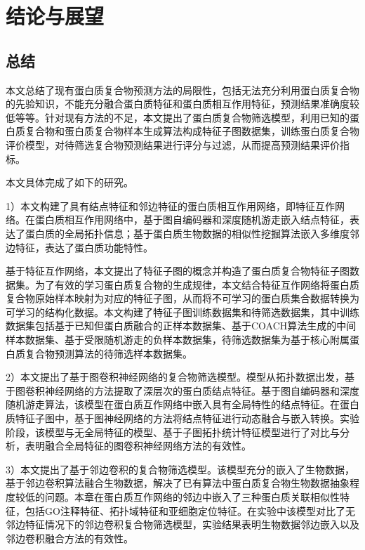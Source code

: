 \chapter{结论与展望}
\label{chapter:SummaryAndForward}

\section{总结}
\label{section:allsummary}

本文总结了现有蛋白质复合物预测方法的局限性，包括无法充分利用蛋白质复合物的先验知识，不能充分融合蛋白质特征和蛋白质相互作用特征，预测结果准确度较低等等。针对现有方法的不足，本文提出了蛋白质复合物筛选模型，利用已知的蛋白质复合物和蛋白质复合物样本生成算法构成特征子图数据集，训练蛋白质复合物评价模型，对待筛选复合物预测结果进行评分与过滤，从而提高预测结果评价指标。

本文具体完成了如下的研究。

1）本文构建了具有结点特征和邻边特征的蛋白质相互作用网络，即特征互作网络。在蛋白质相互作用网络中，基于图自编码器和深度随机游走嵌入结点特征，表达了蛋白质的全局拓扑信息；基于蛋白质生物数据的相似性挖掘算法嵌入多维度邻边特征，表达了蛋白质功能特性。

基于特征互作网络，本文提出了特征子图的概念并构造了蛋白质复合物特征子图数据集。为了有效的学习蛋白质复合物的生成规律，本文结合特征互作网络将蛋白质复合物原始样本映射为对应的特征子图，从而将不可学习的蛋白质集合数据转换为可学习的结构化数据。本文构建了特征子图训练数据集和待筛选数据集，其中训练数据集包括基于已知但蛋白质融合的正样本数据集、基于COACH算法生成的中间样本数据集、基于受限随机游走的负样本数据集，待筛选数据集为基于核心附属蛋白质复合物预测算法的待筛选样本数据集。

2）本文提出了基于图卷积神经网络的复合物筛选模型。模型从拓扑数据出发，基于图卷积神经网络的方法提取了深层次的蛋白质结点特征。基于图自编码器和深度随机游走算法，该模型在蛋白质互作网络中嵌入具有全局特性的结点特征。在蛋白质特征子图中，基于图神经网络的方法将结点特征进行动态融合与嵌入转换。实验阶段，该模型与无全局特征的模型、基于子图拓扑统计特征模型进行了对比与分析，表明融合全局特征的图卷积神经网络方法的有效性。
  
3）本文提出了基于邻边卷积的复合物筛选模型。该模型充分的嵌入了生物数据，基于邻边卷积算法融合生物数据，解决了已有算法中蛋白质复合物生物数据抽象程度较低的问题。本章在蛋白质互作网络的邻边中嵌入了三种蛋白质关联相似性特征，包括GO注释特征、拓扑域特征和亚细胞定位特征。在实验中该模型对比了无邻边特征情况下的邻边卷积复合物筛选模型，实验结果表明生物数据邻边嵌入以及邻边卷积融合方法的有效性。

